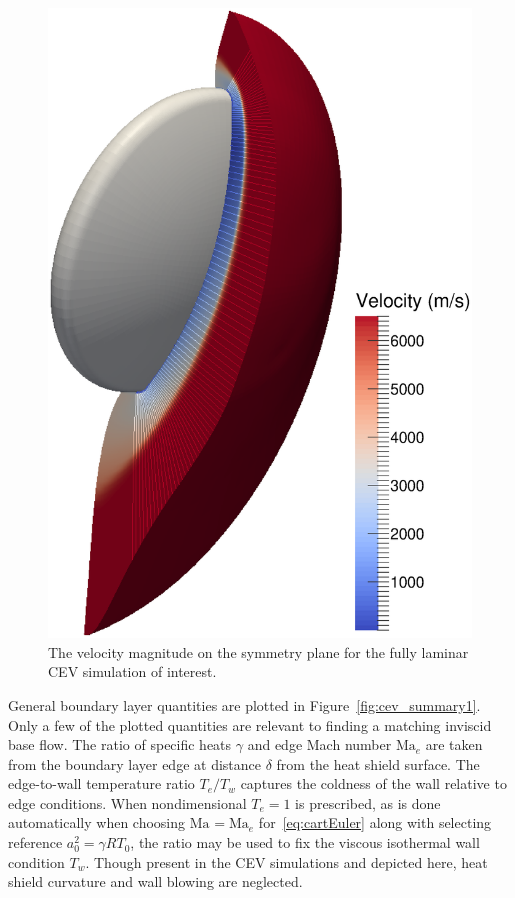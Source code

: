 \documentclass[letterpaper,11pt,nointlimits,reqno]{amsart}
\newcommand{\Mach}[1][]{\mbox{Ma}_{#1}}
\begin{document}
\begin{figure}
  \centering
  \includegraphics[height=0.75\textheight]{symplanenorm}
  \caption{
    \label{fig:cev_symplane}
    The velocity magnitude on the symmetry plane for the fully laminar
    CEV simulation of interest.
  }
\end{figure}

General boundary layer quantities are plotted in Figure~\ref{fig:cev_summary1}.
Only a few of the plotted quantities are relevant to finding a matching inviscid
base flow.  The ratio of specific heats $\gamma$ and edge Mach number
$\Mach[e]{}$ are taken from the boundary layer edge at distance $\delta$ from
the heat shield surface. The edge-to-wall temperature ratio $T_e/T_w$ captures
the coldness of the wall relative to edge conditions.   When nondimensional $T_e
= 1$ is prescribed, as is done automatically when choosing $\Mach = \Mach[e]$
for~\eqref{eq:cartEuler} along with selecting reference $a_0^2 = \gamma R T_0$,
the ratio may be used to fix the viscous isothermal wall condition $T_w$. Though
present in the CEV simulations and depicted here, heat shield curvature and wall
blowing are neglected.
\end{document}
